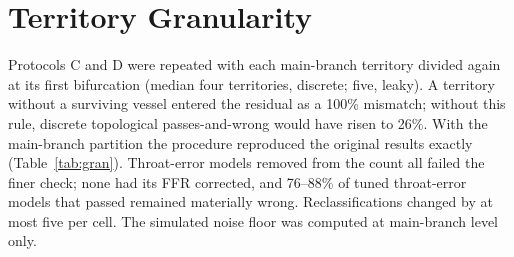 \documentclass[journal,twoside,web,onecolumn]{ieeecolor}
\begin{document}
\section{Territory Granularity}\label{sec:granularity}
Protocols C and D were repeated with each main-branch territory divided again at its first bifurcation (median four territories, discrete; five, leaky). A territory without a surviving vessel entered the residual as a 100\% mismatch; without this rule, discrete topological passes-and-wrong would have risen to 26\%. With the main-branch partition the
procedure reproduced the original results exactly (Table~\ref{tab:gran}). Throat-error models removed from the count
all failed the finer check; none had its FFR corrected, and 76--88\% of tuned throat-error models that passed remained
materially wrong. Reclassifications changed by at most five per cell. The simulated noise floor was computed at
main-branch level only.
\end{document}
